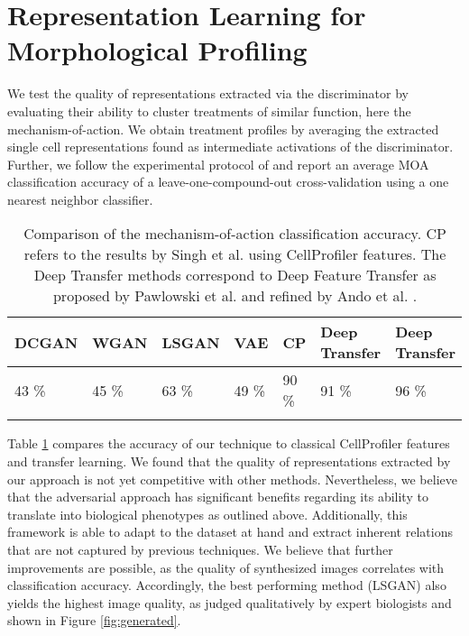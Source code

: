 \documentclass{article}
\begin{document}
\section{Representation Learning for Morphological Profiling}\label{moa}
We test the quality of representations extracted via the discriminator by evaluating their ability to cluster treatments of similar function, here the mechanism-of-action. We obtain treatment profiles by averaging the extracted single cell representations found as intermediate activations of the discriminator. Further, we follow the experimental protocol of \cite{Ljosa2013} and report an average MOA classification accuracy of a leave-one-compound-out cross-validation using a one nearest neighbor classifier.
\begin{table}
  \centering
  \begin{tabular}{lllllll}
  	\toprule
    DCGAN & WGAN & LSGAN & VAE \cite{pawlowski2016msc} & CP \cite{Singh2014} & Deep Transfer \cite{pawlowski2016automating}  & Deep Transfer \cite{ando2017improving} \\
    \midrule
    43 \%& 45 \% & 63 \% & 49 \% & 90 \% & 91 \% & 96 \% \\
    \bottomrule \\
  \end{tabular}
  \caption{Comparison of the mechanism-of-action classification accuracy. CP refers to the results by Singh et al. \cite{Singh2014} using CellProfiler features. The Deep Transfer methods correspond to Deep Feature Transfer as proposed by Pawlowski et al. \cite{pawlowski2016automating} and refined by Ando et al. \cite{ando2017improving}.}
  \label{moa-results}
  \vspace{-0.5cm}
\end{table}

Table \ref{moa-results} compares the accuracy of our technique to classical CellProfiler features and transfer learning. We found that the quality of representations extracted by our approach is not yet competitive with other methods. Nevertheless, we believe that the adversarial approach has significant benefits regarding its ability to translate into biological phenotypes as outlined above. Additionally, this framework is able to adapt to the dataset at hand and extract inherent relations that are not captured by previous techniques. We believe that further improvements are possible, as the quality of synthesized images correlates with classification accuracy. Accordingly, the best performing method (LSGAN) also yields the highest image quality, as judged qualitatively by expert biologists and shown in Figure \ref{fig:generated}.
\end{document}
